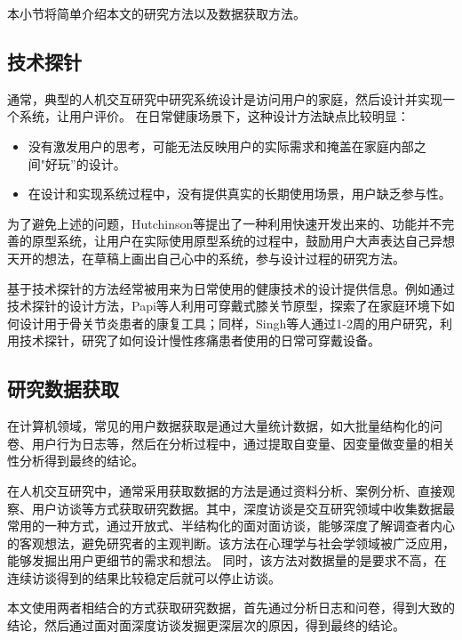 本小节将简单介绍本文的研究方法以及数据获取方法。


\subsection{技术探针}

通常，典型的人机交互研究中研究系统设计是访问用户的家庭，然后设计并实现一个系统，让用户评价。
在日常健康场景下，这种设计方法缺点比较明显\cite{Hutchinson2003Technology}：

\begin{itemize}
    \item 没有激发用户的思考，可能无法反映用户的实际需求和掩盖在家庭内部之间"好玩”的设计。
    \item 在设计和实现系统过程中，没有提供真实的长期使用场景，用户缺乏参与性。  
\end{itemize}


为了避免上述的问题，Hutchinson等\cite{Hutchinson2003Technology}提出了一种利用快速开发出来的、功能并不完善的原型系统，让用户在实际使用原型系统的过程中，鼓励用户大声表达自己异想天开的想法，在草稿上画出自己心中的系统，参与设计过程的研究方法。

基于技术探针的方法经常被用来为日常使用的健康技术的设计提供信息。例如通过技术探针的设计方法，Papi等人\cite{papi2015knee}利用可穿戴式膝关节原型，探索了在家庭环境下如何设计用于骨关节炎患者的康复工具；同样，Singh等人\cite{singh2017supporting}通过1-2周的用户研究，利用技术探针，研究了如何设计慢性疼痛患者使用的日常可穿戴设备。

\subsection{研究数据获取}
在计算机领域，常见的用户数据获取是通过大量统计数据，如大批量结构化的问卷、用户行为日志等，然后在分析过程中，通过提取自变量、因变量做变量的相关性分析得到最终的结论。

在人机交互研究中，通常采用获取数据的方法是通过资料分析、案例分析、直接观察、用户访谈等方式获取研究数据。其中，深度访谈是交互研究领域中收集数据最常用的一种方式，通过开放式、半结构化的面对面访谈，能够深度了解调查者内心的客观想法，避免研究者的主观判断。该方法在心理学与社会学领域被广泛应用，能够发掘出用户更细节的需求和想法。
同时，该方法对数据量的是要求不高，在连续访谈得到的结果比较稳定后就可以停止访谈。

本文使用两者相结合的方式获取研究数据，首先通过分析日志和问卷，得到大致的结论，然后通过面对面深度访谈发掘更深层次的原因，得到最终的结论。

